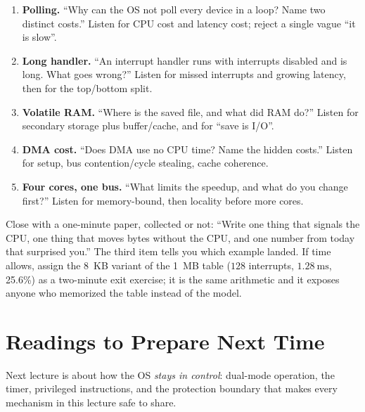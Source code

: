 \documentclass[11pt]{article}
\begin{document}
\begin{enumerate}
  \item \textbf{Polling.} ``Why can the OS not poll every device in a loop? Name
    two distinct costs.'' Listen for CPU cost and latency cost; reject a single
    vague ``it is slow''.
  \item \textbf{Long handler.} ``An interrupt handler runs with interrupts
    disabled and is long. What goes wrong?'' Listen for missed interrupts and
    growing latency, then for the top/bottom split.
  \item \textbf{Volatile RAM.} ``Where is the saved file, and what did RAM do?''
    Listen for secondary storage plus buffer/cache, and for ``save is I/O''.
  \item \textbf{DMA cost.} ``Does DMA use no CPU time? Name the hidden costs.''
    Listen for setup, bus contention/cycle stealing, cache coherence.
  \item \textbf{Four cores, one bus.} ``What limits the speedup, and what do you
    change first?'' Listen for memory-bound, then locality before more cores.
\end{enumerate}

Close with a one-minute paper, collected or not: ``Write one thing that signals
the CPU, one thing that moves bytes without the CPU, and one number from today
that surprised you.'' The third item tells you which example landed. If time
allows, assign the 8~KB variant of the 1~MB table ($128$ interrupts,
$1.28\ \text{ms}$, 25.6\%) as a two-minute exit exercise; it is the same
arithmetic and it exposes anyone who memorized the table instead of the model.

\section{Readings to Prepare Next Time}

Next lecture is about how the OS \emph{stays in control}: dual-mode operation,
the timer, privileged instructions, and the protection boundary that makes every
mechanism in this lecture safe to share.
\end{document}
